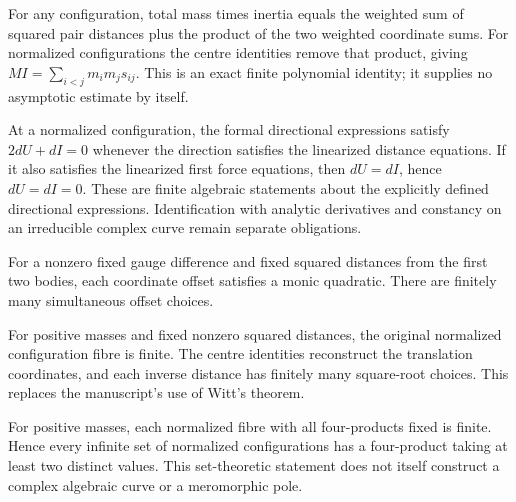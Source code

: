 \begin{lemma}
\label{bp:pair-inertia}
\leanok
For any configuration, total mass times inertia equals the weighted sum of
squared pair distances plus the product of the two weighted coordinate sums.
For normalized configurations the centre identities remove that product,
giving $MI=\sum_{i<j}m_i m_j s_{ij}$. This is an exact finite polynomial
identity; it supplies no asymptotic estimate by itself.
\end{lemma}

\begin{lemma}
\label{bp:tangent-energy}
\leanok
At a normalized configuration, the formal directional expressions satisfy
$2dU+dI=0$ whenever the direction satisfies the linearized distance equations.
If it also satisfies the linearized first force equations, then $dU=dI$,
hence $dU=dI=0$. These are finite algebraic statements about the explicitly
defined directional expressions. Identification with analytic derivatives
and constancy on an irreducible complex curve remain separate obligations.
\end{lemma}

\begin{lemma}
\label{bp:quadratic}
\leanok
For a nonzero fixed gauge difference and fixed squared distances from the
first two bodies, each coordinate offset satisfies a monic quadratic.
There are finitely many simultaneous offset choices.
\end{lemma}

\begin{theorem}
\label{bp:distance-fibre}
\leanok
For positive masses and fixed nonzero squared distances, the original
normalized configuration fibre is finite. The centre identities reconstruct
the translation coordinates, and each inverse distance has finitely many
square-root choices. This replaces the manuscript's use of Witt's theorem.
\end{theorem}

\begin{theorem}
\label{bp:fourproduct-fibre}
\leanok
For positive masses, each normalized fibre with all four-products fixed is
finite. Hence every infinite set of normalized configurations has a
four-product taking at least two distinct values. This set-theoretic statement
does not itself construct a complex algebraic curve or a meromorphic pole.
\end{theorem}


